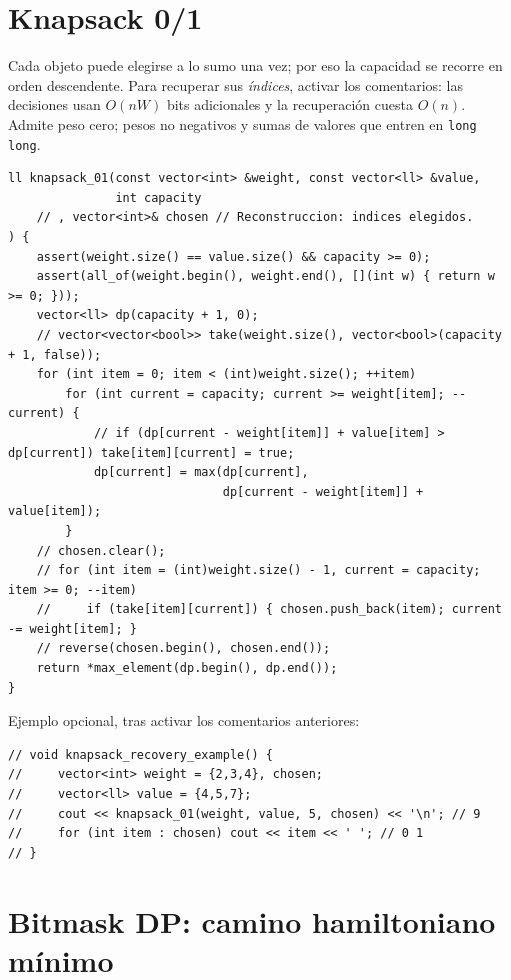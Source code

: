 \section{Knapsack 0/1}

Cada objeto puede elegirse a lo sumo una vez; por eso la capacidad se recorre
en orden descendente.
Para recuperar sus \emph{\'indices}, activar los comentarios: las decisiones
usan $O(nW)$ bits adicionales y la recuperaci\'on cuesta $O(n)$. Admite peso cero;
pesos no negativos y sumas de valores que entren en \texttt{long long}.

\begin{lstlisting}[style=cpp]
ll knapsack_01(const vector<int> &weight, const vector<ll> &value,
               int capacity
    // , vector<int>& chosen // Reconstruccion: indices elegidos.
) {
    assert(weight.size() == value.size() && capacity >= 0);
    assert(all_of(weight.begin(), weight.end(), [](int w) { return w >= 0; }));
    vector<ll> dp(capacity + 1, 0);
    // vector<vector<bool>> take(weight.size(), vector<bool>(capacity + 1, false));
    for (int item = 0; item < (int)weight.size(); ++item)
        for (int current = capacity; current >= weight[item]; --current) {
            // if (dp[current - weight[item]] + value[item] > dp[current]) take[item][current] = true;
            dp[current] = max(dp[current],
                              dp[current - weight[item]] + value[item]);
        }
    // chosen.clear();
    // for (int item = (int)weight.size() - 1, current = capacity; item >= 0; --item)
    //     if (take[item][current]) { chosen.push_back(item); current -= weight[item]; }
    // reverse(chosen.begin(), chosen.end());
    return *max_element(dp.begin(), dp.end());
}
\end{lstlisting}


Ejemplo opcional, tras activar los comentarios anteriores:
\begin{lstlisting}[style=cpp]
// void knapsack_recovery_example() {
//     vector<int> weight = {2,3,4}, chosen;
//     vector<ll> value = {4,5,7};
//     cout << knapsack_01(weight, value, 5, chosen) << '\n'; // 9
//     for (int item : chosen) cout << item << ' '; // 0 1
// }
\end{lstlisting}

\section{Bitmask DP: camino hamiltoniano m\'inimo}


